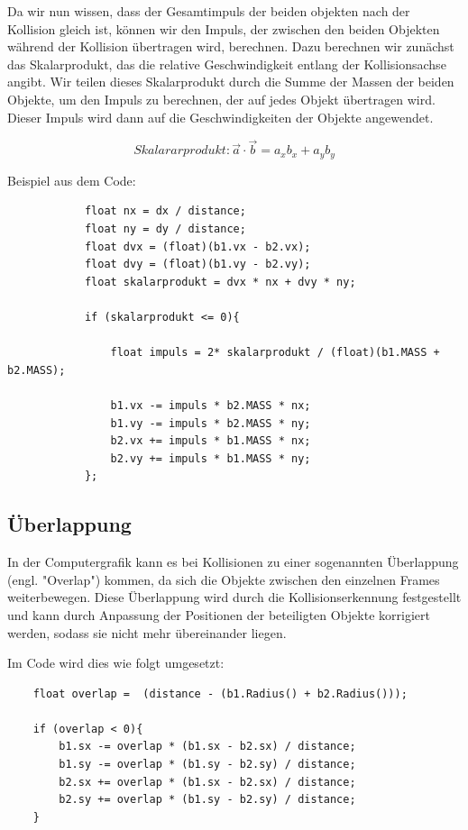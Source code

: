 \documentclass[12pt,a4paper]{article}
\begin{document}
		
		Da wir nun wissen, dass der Gesamtimpuls der beiden objekten nach der Kollision gleich ist, können wir den Impuls, der zwischen den beiden Objekten während der Kollision übertragen wird, berechnen. Dazu berechnen wir zunächst das Skalarprodukt, das die relative Geschwindigkeit entlang der Kollisionsachse angibt. Wir teilen dieses Skalarprodukt durch die Summe der Massen der beiden Objekte, um den Impuls zu berechnen, der auf jedes Objekt übertragen wird. Dieser Impuls wird dann auf die Geschwindigkeiten der Objekte angewendet.
		
		 \[Skalararprodukt:
		\vec{a} \cdot \vec{b} = a_x b_x + a_y b_y 
		\]
		
Beispiel aus dem Code:

		\begin{verbatim}
			float nx = dx / distance;
			float ny = dy / distance;
			float dvx = (float)(b1.vx - b2.vx);
			float dvy = (float)(b1.vy - b2.vy);
			float skalarprodukt = dvx * nx + dvy * ny;
			
			if (skalarprodukt <= 0){
				
				float impuls = 2* skalarprodukt / (float)(b1.MASS + b2.MASS);
				
				b1.vx -= impuls * b2.MASS * nx;
				b1.vy -= impuls * b2.MASS * ny;
				b2.vx += impuls * b1.MASS * nx;
				b2.vy += impuls * b1.MASS * ny;
			};
		\end{verbatim}
		
		
		\subsection{Überlappung}
		
In der Computergrafik kann es bei Kollisionen zu einer sogenannten Überlappung (engl. "Overlap") kommen, da sich die Objekte zwischen den einzelnen Frames weiterbewegen. Diese Überlappung wird durch die Kollisionserkennung festgestellt und kann durch Anpassung der Positionen der beteiligten Objekte korrigiert werden, sodass sie nicht mehr übereinander liegen.
	\vspace{0.5cm}
		
Im Code wird dies wie folgt umgesetzt:
\begin{verbatim}
    float overlap =  (distance - (b1.Radius() + b2.Radius()));
    
    if (overlap < 0){
    	b1.sx -= overlap * (b1.sx - b2.sx) / distance;
    	b1.sy -= overlap * (b1.sy - b2.sy) / distance;
    	b2.sx += overlap * (b1.sx - b2.sx) / distance;
    	b2.sy += overlap * (b1.sy - b2.sy) / distance;
    }
\end{verbatim}
		
\end{document}
